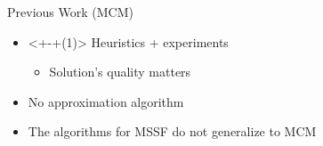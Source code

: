 \begin{frame}{Previous Work (MCM)}
\begin{itemize}[<+>]
  \item<+-+(1)> Heuristics + experiments
  	\begin{itemize}[<+>]
  	  \item Solution's quality \alert{matters}
	\end{itemize} 
  \item No approximation algorithm
  \item The algorithms for MSSF do not generalize to MCM  
\end{itemize}
\end{frame}